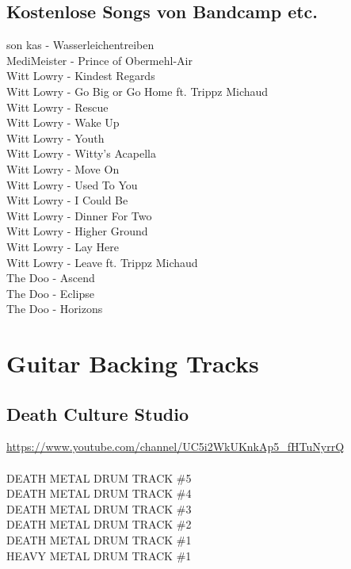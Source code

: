 \section{Kostenlose Songs von Bandcamp etc.}

son kas - Wasserleichentreiben\\
MediMeister - Prince of Obermehl-Air\\
Witt Lowry - Kindest Regards\\
Witt Lowry - Go Big or Go Home ft. Trippz Michaud\\
Witt Lowry - Rescue\\
Witt Lowry - Wake Up\\
Witt Lowry - Youth\\
Witt Lowry - Witty's Acapella\\
Witt Lowry - Move On\\
Witt Lowry - Used To You\\
Witt Lowry - I Could Be\\
Witt Lowry - Dinner For Two\\
Witt Lowry - Higher Ground\\
Witt Lowry - Lay Here\\
Witt Lowry - Leave ft. Trippz Michaud\\
The Doo - Ascend\\
The Doo - Eclipse\\
The Doo - Horizons\\

\chapter{Guitar Backing Tracks}\label{btracks}

\section{Death Culture Studio}

\url*{https://www.youtube.com/channel/UC5i2WkUKnkAp5\_fHTuNyrrQ}\\
\ \\
DEATH METAL DRUM TRACK \#5\\
DEATH METAL DRUM TRACK \#4\\
DEATH METAL DRUM TRACK \#3\\
DEATH METAL DRUM TRACK \#2\\
DEATH METAL DRUM TRACK \#1\\
HEAVY METAL DRUM TRACK \#1\\

